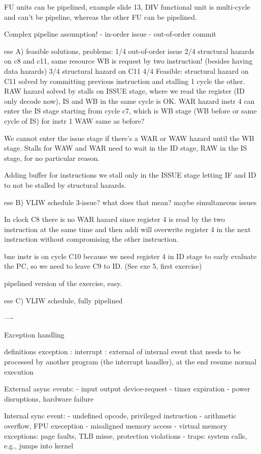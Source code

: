 FU units can be pipelined, example slide 13, DIV functional unit is multi-cycle and can't be pipeline, whereas the other
FU can be pipelined.

Complex pipeline assumption!
- in-order issue
- out-of-order commit

ese A) feasible solutions, problems:
1/4 out-of-order issue
2/4 structural hazards on c8 and c11, same resource WB is request by two instruction! (besides having data hazards)
3/4 structural hazard on C11
4/4 Feasible:
structural hazard on C11 solved by committing previous instruction and stalling 1 cycle the other.
RAW hazard solved by stalls on ISSUE stage, where we read the register (ID only decode now), IS and WB in the same cycle is OK\@.
WAR hazard instr 4 can enter the IS stage starting from cycle c7, which is WB stage (WB before or same cycle of IS) for instr 1
WAW same as before?

We cannot enter the issue stage if there's a WAR or WAW hazard until the WB stage.
Stalls for WAW and WAR need to wait in the ID stage, RAW in the IS stage, for no particular reason.

Adding buffer for instructions we stall only in the ISSUE stage letting IF and ID to not be stalled by structural hazards.

ese B) VLIW schedule
3-issue? what does that mean? maybe simultaneous issues

In clock C8 there is no WAR hazard since register 4 is read by the two instruction at the same time and then addi will overwrite
register 4  in the next instruction without compromising the other instruction.

bne instr is on cycle C10 because we need register 4 in ID stage to early evaluate the PC, so we need to leave C9 to ID.
(See exe 5, first exercise)

pipelined version of the exercise, easy.

ese C) VLIW schedule, fully pipelined


----

Exception handling

definitions
exception :
interrupt : external of internal event that needs to be processed by another program (the interrupt handler), at the end resume normal execution

External async events:
- input output device-request
- timer expiration
- power disruptions, hardware failure

Internal sync event:
- undefined opcode, privileged instruction
- arithmetic overflow, FPU exeception
- misaligned memory access
- virtual memory exceptions: page faults, TLB misse, protection violations
- traps: system calls, e.g., jumps into kernel

